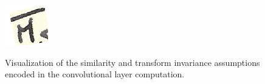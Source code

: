 \documentclass[english,twoside,openright]{UH_DS_MSc}
\begin{document}
\begin{figure}[h]
{\begin{minipage}[b]{0.45\linewidth}
            \includegraphics[width=\textwidth]{images/rotated_molar.png}
            \label{fig:snowfall4}
        \end{minipage}
    }

    \caption{Visualization of the similarity and transform invariance assumptions encoded in the convolutional layer computation.}
    \label{fig:conv_assumptions}
\end{figure}
\end{document}
